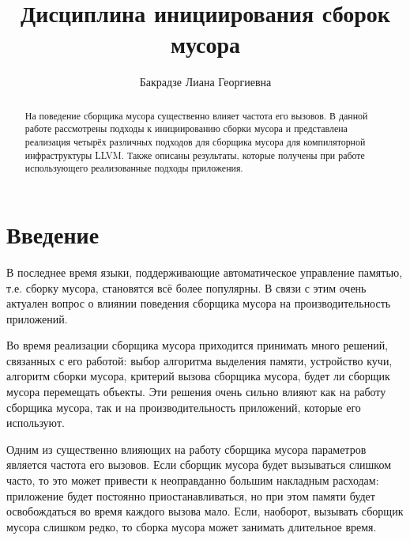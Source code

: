 \title{Дисциплина инициирования сборок мусора}
%
\author{Бакрадзе Лиана Георгиевна}
%
%

%
%

\maketitle              %

\begin{abstract}
На поведение сборщика мусора существенно влияет частота его вызовов. В данной работе рассмотрены подходы 
к инициированию сборки мусора и представлена реализация четырёх различных подходов для сборщика мусора для 
компиляторной инфраструктуры LLVM. Также описаны результаты, которые получены при работе использующего 
реализованные подходы приложения.
\end{abstract}
%

\section*{Введение}

В последнее время языки, поддерживающие автоматическое управление памятью, т.е. сборку 
мусора, становятся всё более популярны. В связи с этим очень актуален вопрос о влиянии
поведения сборщика мусора на производительность приложений.

Во время реализации сборщика мусора приходится принимать много решений,
связанных с его работой: выбор алгоритма выделения памяти, устройство кучи, 
алгоритм сборки мусора, критерий вызова сборщика мусора, будет ли сборщик мусора 
перемещать объекты. Эти решения очень сильно влияют как на работу сборщика мусора, 
так и на
производительность приложений, которые его используют.

Одним из существенно влияющих на работу сборщика мусора параметров
является частота его вызовов. Если 
сборщик мусора будет вызываться слишком часто, то это может привести к неоправданно
большим накладным расходам: приложение будет постоянно приостанавливаться, но при 
этом памяти будет освобождаться во время каждого вызова мало. Если, наоборот, вызывать 
сборщик мусора слишком редко, то сборка мусора может занимать длительное время. 

